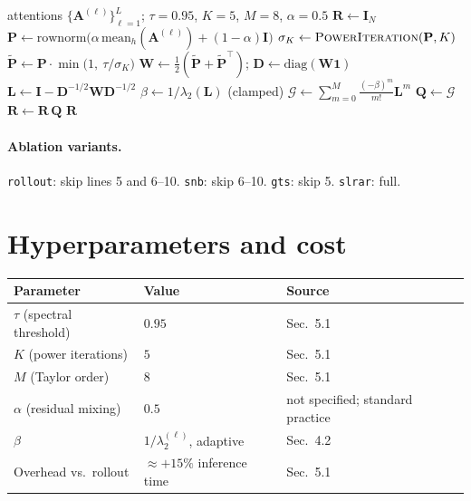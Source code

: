 \documentclass[11pt]{article}
\newcommand{\A}{\mathbf{A}}
\newcommand{\D}{\mathbf{D}}
\newcommand{\I}{\mathbf{I}}
\newcommand{\Lap}{\mathbf{L}}
\newcommand{\Pm}{\mathbf{P}}
\newcommand{\Pt}{\tilde{\mathbf{P}}}
\newcommand{\Q}{\mathbf{Q}}
\newcommand{\R}{\mathbf{R}}
\newcommand{\W}{\mathbf{W}}
\newcommand{\Gcal}{\mathcal{G}}
\begin{document}
\begin{algorithm}[H]
\caption{SLR-AR}
\begin{algorithmic}[1]
\Require attentions $\{\A^{(\ell)}\}_{\ell=1}^{L}$; $\tau=0.95$, $K=5$, $M=8$, $\alpha=0.5$
\State $\R \gets \I_N$
  \State $\Pm \gets \mathrm{rownorm}\big(\alpha\,\mathrm{mean}_h(\A^{(\ell)}) + (1-\alpha)\I\big)$
  \State $\sigma_K \gets \textsc{PowerIteration}(\Pm, K)$ 
  \State $\Pt \gets \Pm\cdot\min\!\big(1,\ \tau/\sigma_K\big)$ 
  \State $\W \gets \tfrac{1}{2}(\Pt + \Pt^{\top})$; \quad $\D \gets \mathrm{diag}(\W\bm{1})$
  \State $\Lap \gets \I - \D^{-1/2}\W\D^{-1/2}$ 
  \State $\beta \gets 1/\lambda_2(\Lap)$ \quad (clamped)
  \State $\Gcal \gets \sum_{m=0}^{M}\frac{(-\beta)^m}{m!}\Lap^{m}$ 
  \State $\Q \gets \Gcal$ 
  \State $\R \gets \R\,\Q$ 
\EndFor
\State \Return $\R$
\end{algorithmic}
\end{algorithm}

\paragraph{Ablation variants.} \texttt{rollout}: skip lines 5 and 6--10. \quad
\texttt{snb}: skip 6--10. \quad \texttt{gts}: skip 5. \quad \texttt{slrar}: full.

\section{Hyperparameters and cost}

\begin{center}
\begin{tabular}{lll}
\toprule
Parameter & Value & Source \\
\midrule
$\tau$ (spectral threshold) & $0.95$ & Sec.~5.1 \\
$K$ (power iterations)      & $5$    & Sec.~5.1 \\
$M$ (Taylor order)          & $8$    & Sec.~5.1 \\
$\alpha$ (residual mixing)  & $0.5$  & not specified; standard practice \\
$\beta$                     & $1/\lambda_2^{(\ell)}$, adaptive & Sec.~4.2 \\
Overhead vs.\ rollout       & $\approx +15\%$ inference time & Sec.~5.1 \\
\bottomrule
\end{tabular}
\end{center}
\end{document}
